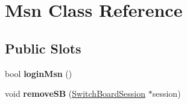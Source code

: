 \hypertarget{classMsn}{
\section{Msn Class Reference}
\label{classMsn}
}
\subsection*{Public Slots}
\begin{DoxyCompactItemize}
\item 
\hypertarget{classMsn_ae5b3b36d57ac78ee3f1fab34c93a55cc}{
bool {\bfseries loginMsn} ()}
\label{classMsn_ae5b3b36d57ac78ee3f1fab34c93a55cc}

\item 
\hypertarget{classMsn_ae2204eac2373c0a0064d683e9a75b2a1}{
void {\bfseries removeSB} (\hyperlink{classSwitchBoardSession}{SwitchBoardSession} $\ast$session)}
\label{classMsn_ae2204eac2373c0a0064d683e9a75b2a1}

\end{DoxyCompactItemize}
